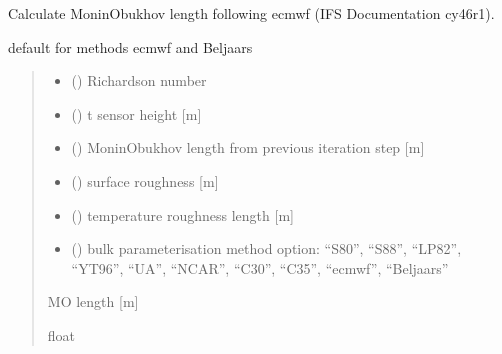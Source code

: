 \documentclass[letterpaper,10pt,english]{sphinxmanual}
\begin{document}
\begin{fulllineitems}

\pysigstartsignatures
{}
\pysigstopsignatures
\sphinxAtStartPar
Calculate Monin\sphinxhyphen{}Obukhov length following ecmwf (IFS Documentation cy46r1).

\sphinxAtStartPar
default for methods ecmwf and Beljaars
\begin{quote}\begin{description}
\begin{itemize}
\item {} 
\sphinxAtStartPar
{} () \textendash{} Richardson number

\item {} 
\sphinxAtStartPar
{} () \textendash{} t sensor height {[}m{]}

\item {} 
\sphinxAtStartPar
{} () \textendash{} Monin\sphinxhyphen{}Obukhov length from previous iteration step {[}m{]}

\item {} 
\sphinxAtStartPar
{} () \textendash{} surface roughness       {[}m{]}

\item {} 
\sphinxAtStartPar
{} () \textendash{} temperature roughness length       {[}m{]}

\item {} 
\sphinxAtStartPar
{} () \textendash{} bulk parameterisation method option: “S80”, “S88”, “LP82”, “YT96”,
“UA”, “NCAR”, “C30”, “C35”, “ecmwf”, “Beljaars”

\end{itemize}

\sphinxAtStartPar
{} \textendash{} M\sphinxhyphen{}O length {[}m{]}

\sphinxAtStartPar
float

\end{description}\end{quote}

\end{fulllineitems}
\end{document}
